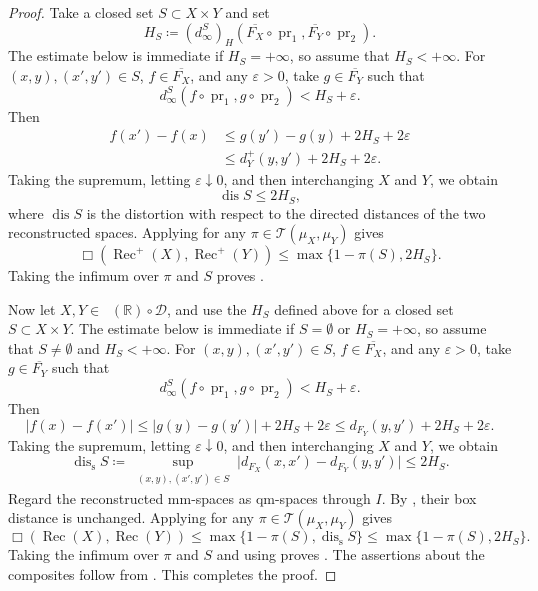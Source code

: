 \documentclass{amsart}
\theoremstyle{plain}
\theoremstyle{definition}
\theoremstyle{remark}
\newcommand{\R}{\mathbb{R}}
\newcommand{\D}{\mathcal{D}}
\DeclareMathOperator{\lipone}{Lip_1}
\DeclareMathOperator{\dis}{dis}
\DeclareMathOperator{\pr}{pr}
\newcommand{\dinf}[1]{d^{#1}_{\infty}}
\newcommand{\haus}[1]{\left(#1\right)_H}
\newcommand{\Tplan}{\mathcal{T}}
\begin{document}
\begin{proof}
Take a closed set $S\subset X\times Y$ and set
\[H_S\coloneqq\haus{\dinf{S}}(\overline{F_X}\circ\pr_1,\overline{F_Y}\circ\pr_2).\]
The estimate below is immediate if $H_S=+\infty$, so assume that $H_S<+\infty$. For $(x,y),(x',y')\in S$, $f\in\overline{F_X}$, and any $\varepsilon>0$, take $g\in\overline{F_Y}$ such that
\[\dinf{S}(f\circ\pr_1,g\circ\pr_2)<H_S+\varepsilon.\]
Then
\begin{align*}
f(x')-f(x)&\leq g(y')-g(y)+2H_S+2\varepsilon\\
&\leq d_Y^+(y,y')+2H_S+2\varepsilon.
\end{align*}
Taking the supremum, letting $\varepsilon\downarrow0$, and then interchanging $X$ and $Y$, we obtain
\[\dis S\leq2H_S,\]
where $\dis S$ is the distortion with respect to the directed distances of the two reconstructed spaces. Applying  for any $\pi\in\Tplan(\mu_X,\mu_Y)$ gives
\[
\Box(\operatorname{Rec}^{+}(X),\operatorname{Rec}^{+}(Y))
\leq\max\{1-\pi(S),2H_S\}.
\]
Taking the infimum over $\pi$ and $S$ proves .

Now let $X,Y\in\lipone(\R)\circ\D$, and use the $H_S$ defined above for a closed set $S\subset X\times Y$. The estimate below is immediate if $S=\emptyset$ or $H_S=+\infty$, so assume that $S\neq\emptyset$ and $H_S<+\infty$. For $(x,y),(x',y')\in S$, $f\in\overline{F_X}$, and any $\varepsilon>0$, take $g\in\overline{F_Y}$ such that
\[\dinf{S}(f\circ\pr_1,g\circ\pr_2)<H_S+\varepsilon.\]
Then
\[
|f(x)-f(x')|\leq |g(y)-g(y')|+2H_S+2\varepsilon
\leq d_{F_Y}(y,y')+2H_S+2\varepsilon.
\]
Taking the supremum, letting $\varepsilon\downarrow0$, and then interchanging $X$ and $Y$, we obtain
\[
\dis_{\mathrm s}S\coloneqq
\sup_{\substack{(x,y),(x',y')\in S}}
\bigl|d_{F_X}(x,x')-d_{F_Y}(y,y')\bigr|
\leq2H_S.
\]
Regard the reconstructed mm-spaces as qm-spaces through $I$. By , their box distance is unchanged. Applying  for any $\pi\in\Tplan(\mu_X,\mu_Y)$ gives
\[
\Box(\operatorname{Rec}(X),\operatorname{Rec}(Y))
\leq\max\{1-\pi(S),\dis_{\mathrm s}S\}
\leq\max\{1-\pi(S),2H_S\}.
\]
Taking the infimum over $\pi$ and $S$ and using  proves . The assertions about the composites follow from .
This completes the proof.
\end{proof}
\end{document}

